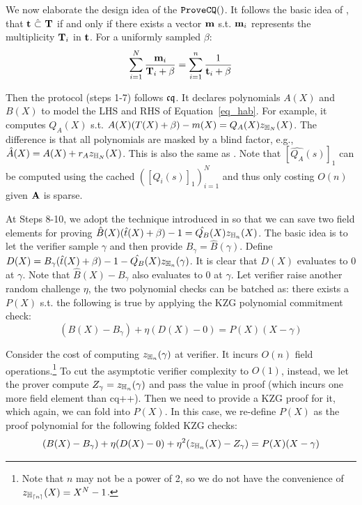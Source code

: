 We now elaborate the design idea of the ${\texttt{ProveCQ}}()$.
It follows the basic idea of \cite{Hab22}, that 
${{\mathbf {t}}} ~\hat{\subset}~ {{\mathbf {T}}}$ if and only if there exists a
vector ${{\mathbf {m}}}$ s.t. ${{\mathbf {m}}}_i$ represents the multiplicity 
${{\mathbf {T}}}_i$ in ${{\mathbf {t}}}$. For a uniformly sampled
$\beta$:
\begin{equation} \label{eq_hab}
	\sum_{i=1}^N \frac{{{\mathbf {m}}}_i}{{{\mathbf {T}}}_i +\beta} = 
	\sum_{i=1}^n \frac{1}{{{\mathbf {t}}}_i+\beta}  
\end{equation}

Then the protocol (steps 1-7) follows ${\mathfrak{cq}}$. It declares
polynomials $A(X)$ and $B(X)$ to model the LHS and RHS
of Equation\ \ref{eq_hab}. For example, it computes $Q_A(X)$
s.t. $A(X)(T(X) + \beta) - m(X) = Q_A(X) z_{\mathbb{H}_{N}}(X)$. The difference
is that all polynomials are masked by a blind factor, e.g., 
$\hat{A}(X) = A(X) + r_A z_{\mathbb{H}_{N}}(X)$. This is also the same
as \cite{MatrixLookup,CCG23}. Note that $[\hat{Q_A}(s)]_1$
can be computed using the cached $([Q_i(s)]_1)_{i=1}^N$ and 
thus only costing $O(n)$ given ${{\mathbf {A}}}$ is sparse.

At Steps 8-10, we adopt the technique introduced in \cite{MatrixLookup}
so that we can save two field elements for proving
$\hat{B}(X)(\hat{t}(X) + \beta) -1 = \hat{Q_B}(X) z_{\mathbb{H}_{n}}(X)$.
The basic idea is to let the verifier sample $\gamma$ and then
provide $B_\gamma = \hat{B}(\gamma)$.
Define $D(X) = B_\gamma(\hat{t}(X) + \beta) - 1 - \hat{Q_B}(X) z_{\mathbb{H}_{n}}(\gamma)$.
It is clear that $D(X)$ evaluates to $0$ at $\gamma$.
Note that $\hat{B}(X) - B_\gamma$ also evaluates to $0$ at
$\gamma$. Let verifier raise another random challenge $\eta$,
the two polynomial checks can be batched as: there exists
a $P(X)$ s.t. the following is true by applying the KZG polynomial
commitment check:
\[
	(B(X) - B_\gamma) + \eta (D(X) - 0) = P(X)(X - \gamma)
\]

Consider the cost of computing $z_{\mathbb{H}_{n}}(\gamma)$ at verifier.
It incurs $O(n)$ field operations.\footnote{Note that $n$
may not be a power of 2, so we do not have
the convenience of $z_{\mathbb{H}_{{\lceil{n}\rceil}}}(X) = X^N -1$.}
To cut the asymptotic verifier
complexity to $O(1)$, instead, we let the prover
compute $Z_\gamma = z_{\mathbb{H}_{n}}(\gamma)$ and pass the value
in proof (which incurs one more field element than cq++).
Then we need to provide a KZG proof for it, which again, we can
fold into $P(X)$. In this case, we re-define $P(X)$ as the proof
polynomial for the following folded KZG checks:
\[
	(B(X) - B_\gamma) + \eta (D(X) - 0) + \eta^2(z_{\mathbb{H}_{n}}(X)-Z_\gamma) 
	= P(X)(X - \gamma)
\]

